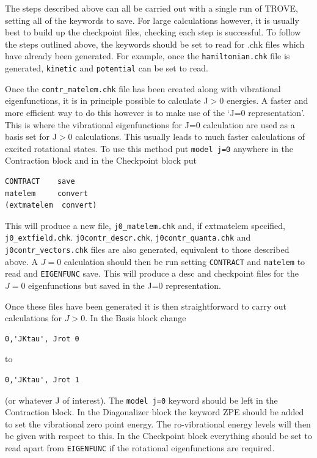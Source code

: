 The steps described above can all be carried out with a single run of TROVE, setting all of the keywords to save. 
For large calculations however, it is usually best to build up the checkpoint files, checking each step is successful. 
To follow the steps outlined above, the keywords should be set to read for .chk files which have already 
been generated. For example, once the \verb|hamiltonian.chk| file is generated, \verb|kinetic| and \verb|potential| 
can be set to read.

Once the \verb|contr_matelem.chk| file has been created along with vibrational eigenfunctions, 
it is in principle possible to calculate J$>0$ energies. 
A faster and more efficient way to do this however is to make
use of the `J=0 representation'. This is where the vibrational eigenfunctions for J=0 calculation 
are used as a basis set for J$>0$ calculations.\cite{jt466} This usually leads to much faster
calculations of excited rotational states. 
To use this method put \verb|model j=0| anywhere in the Contraction block and in the Checkpoint block put
\begin{verbatim}
CONTRACT    save
matelem     convert
(extmatelem  convert)
\end{verbatim}
This will produce a new file, \verb|j0_matelem.chk| and, if extmatelem specified, \verb|j0_extfield.chk|. 
\verb|j0contr_descr.chk|, \verb|j0contr_quanta.chk| and
\verb|j0contr_vectors.chk| files are also generated, equivalent to those described above. A $J=0$ calculation should then 
be run setting \verb|CONTRACT| and \verb|matelem| to read and \verb|EIGENFUNC| save. This will produce a desc and checkpoint
files for the $J=0$ eigenfunctions but saved in the J=0 representation. 

Once these files have been generated it is then straightforward to carry out calculations for $J>0$. In the Basis block change
\begin{verbatim}
0,'JKtau', Jrot 0 
\end{verbatim}
to 
\begin{verbatim}
0,'JKtau', Jrot 1
\end{verbatim}
(or whatever J of interest). 
The \verb|model j=0| keyword should be left in the Contraction block. In the Diagonalizer block the keyword ZPE should 
be added to set the vibrational zero point energy. 
The ro-vibrational energy levels will then be given with respect to this. 
In the Checkpoint block everything should be set to read apart from \verb|EIGENFUNC| if the rotational 
eigenfunctions are required. 


